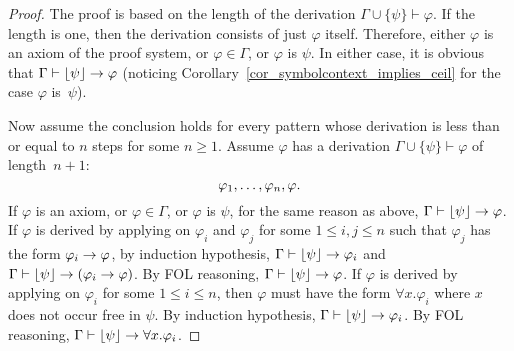 \documentclass{amsart}
\begin{document}
\begin{proof}
The proof is based on the length of
the derivation
$\Gamma \cup \{\psi\} \vdash \varphi$.
If the length is one, then the derivation consists of just
$\varphi$ itself.
Therefore, either $\varphi$ is an axiom of the proof system,
or $\varphi \in \Gamma$, or $\varphi$ is $\psi$.
In either case, it is obvious that
$\Gamma \vdash \lfloor\psi\rfloor \to \varphi$
(noticing Corollary~\ref{cor_symbolcontext_implies_ceil}
 for the case $\varphi$ is~$\psi$).
 
Now assume the conclusion holds for every pattern whose derivation is less than 
or equal to $n$ steps for some $n \ge 1$.
Assume $\varphi$ has a derivation $\Gamma \cup \{\psi\} \vdash \varphi$
of length~$n+1$: 
$$\varphi_1 ,\dots, \varphi_n , \varphi.$$
If $\varphi$ is an axiom, or $\varphi \in \Gamma$,
or $\varphi$ is $\psi$,
for the same reason as above,
$\Gamma \vdash \lfloor\psi\rfloor \to \varphi$.
If $\varphi$ is derived by applying \modusponens
on $\varphi_i$ and $\varphi_j$ for some
$1 \le i, j \le n$
such that $\varphi_j$ has the form $\varphi_i \to \varphi$,
by induction hypothesis,
$\Gamma \vdash \lfloor\psi\rfloor \to \varphi_i$
and
$\Gamma \vdash \lfloor\psi\rfloor \to (\varphi_i \to \varphi)$.
By FOL reasoning,
$\Gamma \vdash \lfloor\psi\rfloor \to \varphi$.
If $\varphi$ is derived by applying \universalgeneralization
on $\varphi_i$ for some $1 \le i \le n$,
then $\varphi$ must have the form $\forall x . \varphi_i$
where $x$ does not occur free in $\psi$.
By induction hypothesis,
$\Gamma \vdash \lfloor\psi\rfloor \to \varphi_i$.
By FOL reasoning,
$\Gamma \vdash \lfloor\psi\rfloor \to \forall x . \varphi_i$.


\end{proof}
\end{document}
